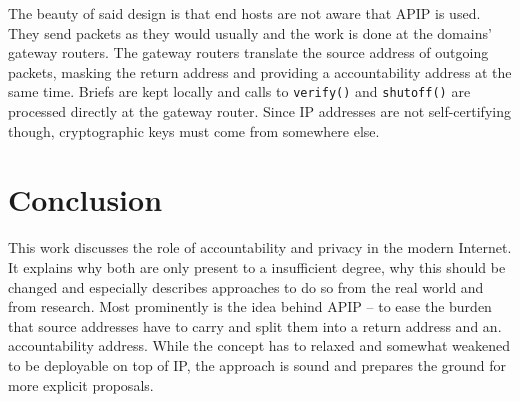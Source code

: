 \documentclass{acm_proc_article-sp}
\begin{document}
The beauty of said design is that end hosts are not aware that APIP is used. They send packets as they would usually and the work is done at the domains' gateway routers. The gateway routers translate the source address of outgoing packets, masking the return address and providing a accountability address at the same time. Briefs are kept locally and calls to \texttt{verify()} and \texttt{shutoff()} are processed directly at the gateway router. Since IP addresses are not self-certifying though, cryptographic keys must come from somewhere else.


\section{Conclusion}
This work discusses the role of accountability and privacy in the modern Internet. It explains why both are only present to a insufficient degree, why this should be changed and especially describes approaches to do so from the real world and from research. Most prominently is the idea behind APIP -- to ease the burden that source addresses have to carry and split them into a return address and an. accountability address. While the concept has to relaxed and somewhat weakened to be deployable on top of IP, the approach is sound and prepares the ground for more explicit proposals.

%

%
%
\balancecolumns
\end{document}
